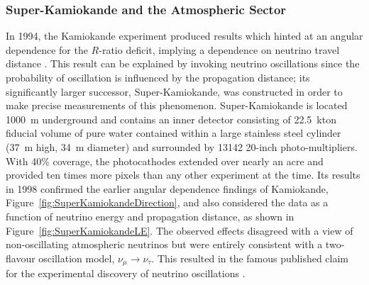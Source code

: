 \subsubsection{Super-Kamiokande and the Atmospheric Sector}\label{sec:SuperKamiokande}

In 1994, the Kamiokande experiment produced results which hinted at an angular dependence for the $R$-ratio deficit, implying a dependence on neutrino travel distance \cite{Kamiokande1994}.  This result can be explained by invoking neutrino oscillations since the probability of oscillation is influenced by the propagation distance; its significantly larger successor, Super-Kamiokande, was constructed in order to make precise measurements of this phenomenon.  Super-Kamiokande is located 1000~m underground and contains an inner detector consisting of 22.5~kton fiducial volume of pure water contained within a large stainless steel cylinder (37~m high, 34~m diameter) and surrounded by 13142 20-inch photo-multipliers.  With 40\% coverage, the photocathodes extended over nearly an acre and provided ten times more pixels than any other experiment at the time.  Its results in 1998 confirmed the earlier angular dependence findings of Kamiokande, Figure~\ref{fig:SuperKamiokandeDirection}, and also considered the data as a function of neutrino energy and propagation distance, as shown in Figure~\ref{fig:SuperKamiokandeLE}.  The observed effects disagreed with a view of non-oscillating atmospheric neutrinos but were entirely consistent with a two-flavour oscillation model, $\nu_{\mu} \rightarrow \nu_{\tau}$.  This resulted in the famous published claim for the experimental discovery of neutrino oscillations \cite{SuperKamiokande1998}.

